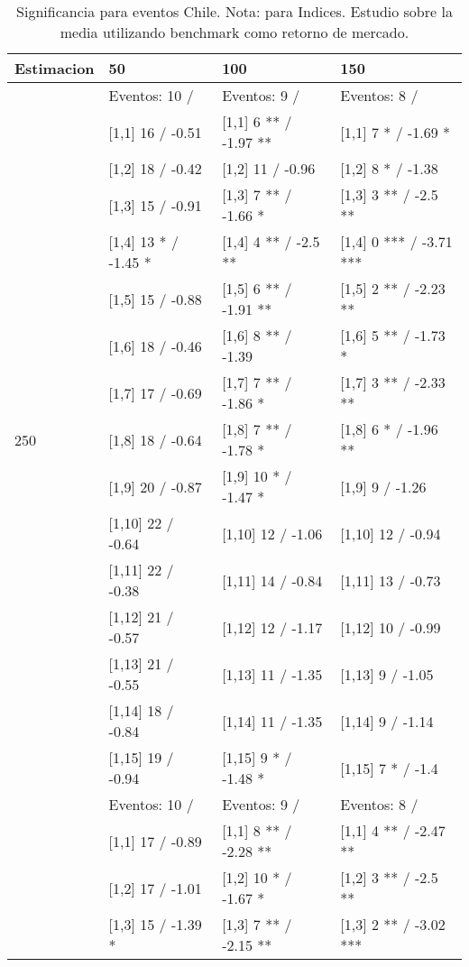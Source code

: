 \begin{table}

\caption{Significancia para eventos Chile. Nota: para Indices. Estudio sobre la media utilizando benchmark como retorno de mercado.}
\centering
\begin{tabular}[t]{llll}
\toprule
Estimacion & 50 & 100 & 150\\
\midrule
 & Eventos:  10 / & Eventos:  9 / & Eventos:  8 /\\
 & {}[1,1] 16  / -0.51 & {}[1,1] 6 ** / -1.97 ** & {}[1,1] 7 * / -1.69 *\\
 & {}[1,2] 18  / -0.42 & {}[1,2] 11  / -0.96 & {}[1,2] 8 * / -1.38\\
 & {}[1,3] 15  / -0.91 & {}[1,3] 7 ** / -1.66 * & {}[1,3] 3 ** / -2.5 **\\
 & {}[1,4] 13 * / -1.45 * & {}[1,4] 4 ** / -2.5 ** & {}[1,4] 0 *** / -3.71 ***\\
\addlinespace
 & {}[1,5] 15  / -0.88 & {}[1,5] 6 ** / -1.91 ** & {}[1,5] 2 ** / -2.23 **\\
 & {}[1,6] 18  / -0.46 & {}[1,6] 8 ** / -1.39 & {}[1,6] 5 ** / -1.73 *\\
 & {}[1,7] 17  / -0.69 & {}[1,7] 7 ** / -1.86 * & {}[1,7] 3 ** / -2.33 **\\
250 & {}[1,8] 18  / -0.64 & {}[1,8] 7 ** / -1.78 * & {}[1,8] 6 * / -1.96 **\\
 & {}[1,9] 20  / -0.87 & {}[1,9] 10 * / -1.47 * & {}[1,9] 9  / -1.26\\
\addlinespace
 & {}[1,10] 22  / -0.64 & {}[1,10] 12  / -1.06 & {}[1,10] 12  / -0.94\\
 & {}[1,11] 22  / -0.38 & {}[1,11] 14  / -0.84 & {}[1,11] 13  / -0.73\\
 & {}[1,12] 21  / -0.57 & {}[1,12] 12  / -1.17 & {}[1,12] 10  / -0.99\\
 & {}[1,13] 21  / -0.55 & {}[1,13] 11  / -1.35 & {}[1,13] 9  / -1.05\\
 & {}[1,14] 18  / -0.84 & {}[1,14] 11  / -1.35 & {}[1,14] 9  / -1.14\\
\addlinespace
 & {}[1,15] 19  / -0.94 & {}[1,15] 9 * / -1.48 * & {}[1,15] 7 * / -1.4\\
 & Eventos:  10 / & Eventos:  9 / & Eventos:  8 /\\
 & {}[1,1] 17  / -0.89 & {}[1,1] 8 ** / -2.28 ** & {}[1,1] 4 ** / -2.47 **\\
 & {}[1,2] 17  / -1.01 & {}[1,2] 10 * / -1.67 * & {}[1,2] 3 ** / -2.5 **\\
 & {}[1,3] 15  / -1.39 * & {}[1,3] 7 ** / -2.15 ** & {}[1,3] 2 ** / -3.02 ***\\

\end{tabular}
\end{table}
